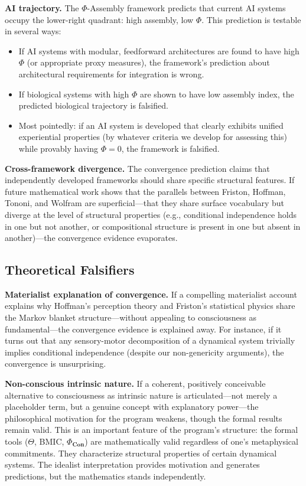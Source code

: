 \documentclass[11pt,a4paper]{article}
\theoremstyle{definition}
\theoremstyle{plain}
\theoremstyle{remark}
\newcommand{\Con}{\mathbf{Con}}
\begin{document}
\textbf{AI trajectory.} The $\Phi$-Assembly framework predicts that current AI systems occupy the lower-right quadrant: high assembly, low $\Phi$. This prediction is testable in several ways:
\begin{itemize}
    \item If AI systems with modular, feedforward architectures are found to have high $\Phi$ (or appropriate proxy measures), the framework's prediction about architectural requirements for integration is wrong.
    \item If biological systems with high $\Phi$ are shown to have low assembly index, the predicted biological trajectory is falsified.
    \item Most pointedly: if an AI system is developed that clearly exhibits unified experiential properties (by whatever criteria we develop for assessing this) while provably having $\Phi = 0$, the framework is falsified.
\end{itemize}

\textbf{Cross-framework divergence.} The convergence prediction claims that independently developed frameworks should share specific structural features. If future mathematical work shows that the parallels between Friston, Hoffman, Tononi, and Wolfram are superficial---that they share surface vocabulary but diverge at the level of structural properties (e.g., conditional independence holds in one but not another, or compositional structure is present in one but absent in another)---the convergence evidence evaporates.

\subsection{Theoretical Falsifiers}\label{sec:theoretical-falsifiers}

\textbf{Materialist explanation of convergence.} If a compelling materialist account explains why Hoffman's perception theory and Friston's statistical physics share the Markov blanket structure---without appealing to consciousness as fundamental---the convergence evidence is explained away. For instance, if it turns out that any sensory-motor decomposition of a dynamical system trivially implies conditional independence (despite our non-genericity arguments), the convergence is unsurprising.

\textbf{Non-conscious intrinsic nature.} If a coherent, positively conceivable alternative to consciousness as intrinsic nature is articulated---not merely a placeholder term, but a genuine concept with explanatory power---the philosophical motivation for the program weakens, though the formal results remain valid. This is an important feature of the program's structure: the formal tools ($\Theta$, BMIC, $\Phi_{\Con}$) are mathematically valid regardless of one's metaphysical commitments. They characterize structural properties of certain dynamical systems. The idealist interpretation provides motivation and generates predictions, but the mathematics stands independently.
\end{document}
